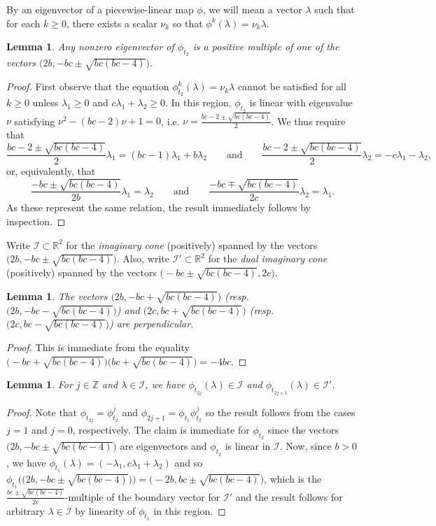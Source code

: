 \documentclass{amsart}
\newtheorem{lemma}[theorem]{Lemma}
\numberwithin{theorem}{section}
\newcommand{\cI}{\mathcal{I}}
\newcommand{\RR}{\mathbb{R}}
\newcommand{\ZZ}{\mathbb{Z}}
\begin{document}
  By an eigenvector of a piecewise-linear map $\phi$, we will mean a vector $\lambda$ such that for each $k\ge0$, there exists a scalar $\nu_k$ so that $\phi^k(\lambda)=\nu_k\lambda$.
  \begin{lemma}
    Any nonzero eigenvector of $\phi_{t_2}$ is a positive multiple of one of the vectors $\big(2b,-bc\pm\sqrt{bc(bc-4)}\big)$.
  \end{lemma}
  \begin{proof}
    First observe that the equation $\phi_{t_2}^k(\lambda)=\nu_k\lambda$ cannot be satisfied for all $k\ge0$ unless $\lambda_1\ge 0$ and $c\lambda_1+\lambda_2\ge 0$.
    In this region, $\phi_{t_2}$ is linear with eigenvalue $\nu$ satisfying $\nu^2-(bc-2)\nu+1=0$, i.e. $\nu=\frac{bc-2\pm\sqrt{bc(bc-4)}}{2}$.
    We thus require that 
    \[\frac{bc-2\pm\sqrt{bc(bc-4)}}{2}\lambda_1=(bc-1)\lambda_1+b\lambda_2 \qquad\text{and}\qquad \frac{bc-2\pm\sqrt{bc(bc-4)}}{2}\lambda_2= -c\lambda_1-\lambda_2,\]
    or, equivalently, that
    \[\frac{-bc\pm\sqrt{bc(bc-4)}}{2b}\lambda_1=\lambda_2 \qquad\text{and}\qquad \frac{-bc\mp\sqrt{bc(bc-4)}}{2c}\lambda_2=\lambda_1.\]
    As these represent the same relation, the result immediately follows by inspection.
  \end{proof}

  Write $\cI \subset \RR^2$ for the \emph{imaginary cone} (positively) spanned by the vectors $\big(2b,-bc\pm\sqrt{bc(bc-4)}\big)$.
  Also, write $\cI' \subset \RR^2$ for the \emph{dual imaginary cone} (positively) spanned by the vectors $\big(-bc\pm\sqrt{bc(bc-4)},2c\big)$.
  \begin{lemma}
    The vectors $\big(2b, -bc+\sqrt{bc(bc-4)}\big)$ (resp. $\big(2b, -bc-\sqrt{bc(bc-4)}\big)$) and $\big(2c, bc+\sqrt{bc(bc-4)}\big)$ (resp. $\big(2c, bc-\sqrt{bc(bc-4)}\big)$) are perpendicular.
  \end{lemma}
  \begin{proof}
    This is immediate from the equality $\big(-bc+\sqrt{bc(bc-4)}\big)\big(bc+\sqrt{bc(bc-4)}\big)=-4bc$.
  \end{proof}
  \begin{lemma}
    \label{le:imaginary stability}
    For $j\in\ZZ$ and $\lambda\in\cI$, we have $\phi_{t_{2j}}(\lambda)\in\cI$ and $\phi_{t_{2j+1}}(\lambda)\in\cI'$.
  \end{lemma}
  \begin{proof}
    Note that $\phi_{t_{2j}}=\phi_{t_2}^j$ and $\phi_{2j+1}=\phi_{t_1}\phi_{t_2}^j$ so the result follows from the cases $j=1$ and $j=0$, respectively.
    The claim is immediate for $\phi_{t_2}$ since the vectors $\big(2b,-bc\pm\sqrt{bc(bc-4)}\big)$ are eigenvectors and $\phi_{t_2}$ is linear in $\cI$.
    Now, since $b>0$, we have $\phi_{t_1}(\lambda)=(-\lambda_1,c\lambda_1+\lambda_2)$ and so $\phi_{t_1}\Big( \big(2b,-bc\pm\sqrt{bc(bc-4)}\big) \Big)=\big(-2b,bc\pm\sqrt{bc(bc-4)}\big)$, which is the $\frac{bc\pm\sqrt{bc(bc-4)}}{2c}$-multiple of the boundary vector for $\cI'$ and the result follows for arbitrary $\lambda\in\cI$ by linearity of $\phi_{t_1}$ in this region.
  \end{proof}
\end{document}
